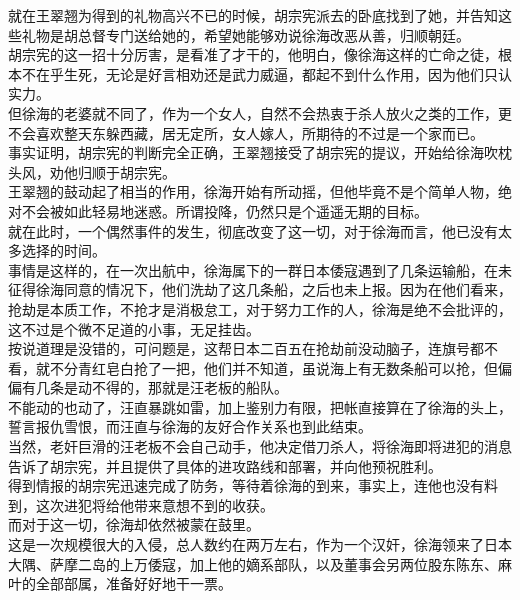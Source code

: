 \begin{multicols}{\theparacolNo}
就在王翠翘为得到的礼物高兴不已的时候，胡宗宪派去的卧底找到了她，并告知这些礼物是胡总督专门送给她的，希望她能够劝说徐海改恶从善，归顺朝廷。\\

胡宗宪的这一招十分厉害，是看准了才干的，他明白，像徐海这样的亡命之徒，根本不在乎生死，无论是好言相劝还是武力威逼，都起不到什么作用，因为他们只认实力。\\

但徐海的老婆就不同了，作为一个女人，自然不会热衷于杀人放火之类的工作，更不会喜欢整天东躲西藏，居无定所，女人嫁人，所期待的不过是一个家而已。\\

事实证明，胡宗宪的判断完全正确，王翠翘接受了胡宗宪的提议，开始给徐海吹枕头风，劝他归顺于胡宗宪。\\

王翠翘的鼓动起了相当的作用，徐海开始有所动摇，但他毕竟不是个简单人物，绝对不会被如此轻易地迷惑。所谓投降，仍然只是个遥遥无期的目标。\\

就在此时，一个偶然事件的发生，彻底改变了这一切，对于徐海而言，他已没有太多选择的时间。\\

事情是这样的，在一次出航中，徐海属下的一群日本倭寇遇到了几条运输船，在未征得徐海同意的情况下，他们洗劫了这几条船，之后也未上报。因为在他们看来，抢劫是本质工作，不抢才是消极怠工，对于努力工作的人，徐海是绝不会批评的，这不过是个微不足道的小事，无足挂齿。\\

按说道理是没错的，可问题是，这帮日本二百五在抢劫前没动脑子，连旗号都不看，就不分青红皂白抢了一把，他们并不知道，虽说海上有无数条船可以抢，但偏偏有几条是动不得的，那就是汪老板的船队。\\

不能动的也动了，汪直暴跳如雷，加上鉴别力有限，把帐直接算在了徐海的头上，誓言报仇雪恨，而汪直与徐海的友好合作关系也到此结束。\\

当然，老奸巨滑的汪老板不会自己动手，他决定借刀杀人，将徐海即将进犯的消息告诉了胡宗宪，并且提供了具体的进攻路线和部署，并向他预祝胜利。\\

得到情报的胡宗宪迅速完成了防务，等待着徐海的到来，事实上，连他也没有料到，这次进犯将给他带来意想不到的收获。\\

而对于这一切，徐海却依然被蒙在鼓里。\\

这是一次规模很大的入侵，总人数约在两万左右，作为一个汉奸，徐海领来了日本大隅、萨摩二岛的上万倭寇，加上他的嫡系部队，以及董事会另两位股东陈东、麻叶的全部部属，准备好好地干一票。\\


\end{multicols}
